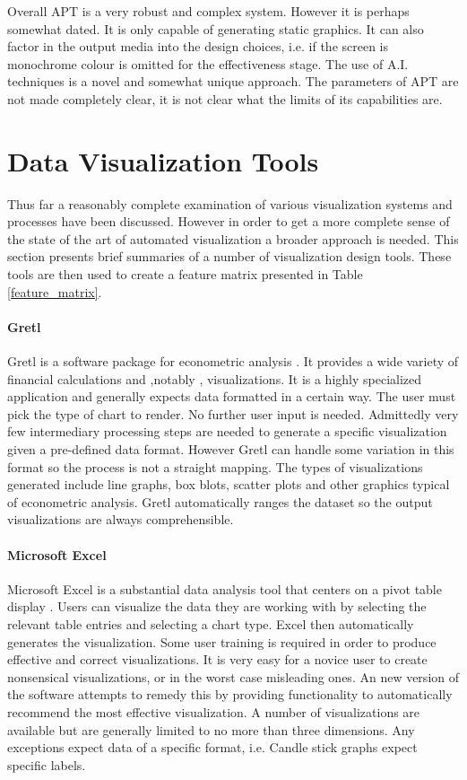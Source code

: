 \documentclass[a4paper, 11pt, titlepage, onehalfspacing]{report}
\begin{document}
Overall APT is a very robust and complex system. However it is perhaps somewhat dated. It is only capable of generating static graphics. It can also factor in the output media into the design choices, i.e. if the screen is monochrome colour is omitted for the effectiveness stage. The use of A.I. techniques is a novel and somewhat unique approach. The parameters of APT are not made completely clear, it is not clear what the limits of its capabilities are.

\section{Data Visualization Tools}
\label{viz_tools}
Thus far a reasonably complete examination of various visualization systems and processes have been discussed. However in order to get a more complete sense of the state of the art of automated visualization a broader approach is needed. This section presents brief summaries of a number of visualization design tools. These tools are then used to create a feature matrix presented in Table \ref{feature_matrix}.

\paragraph{Gretl}
Gretl is a software package for econometric analysis \cite{gretl}. It provides a wide variety of financial calculations and ,notably , visualizations. It is a highly specialized application and generally expects data formatted in a certain way. The user must pick the type of chart to render. No further user input is needed. Admittedly very few intermediary processing steps are needed to generate a specific visualization given a pre-defined data format. However Gretl can handle some variation in this format so the process is not a straight mapping. The types of visualizations generated include line graphs, box blots, scatter plots and other graphics typical of econometric analysis. Gretl automatically ranges the dataset so the output visualizations are always comprehensible.

\paragraph{Microsoft Excel}
Microsoft Excel is a substantial data analysis tool that centers on a pivot table display \cite{excel}. Users can visualize the data they are working with by selecting the relevant table entries and selecting a chart type. Excel then automatically generates the visualization. Some user training is required in order to produce effective and correct visualizations. It is very easy for a novice user to create nonsensical visualizations, or in the worst case misleading ones. An new version of the software attempts to remedy this by providing functionality to automatically recommend the most effective visualization. A number of visualizations are available but are generally limited to no more than three dimensions. Any exceptions expect data of a specific format, i.e. Candle stick graphs expect specific labels.
\end{document}
